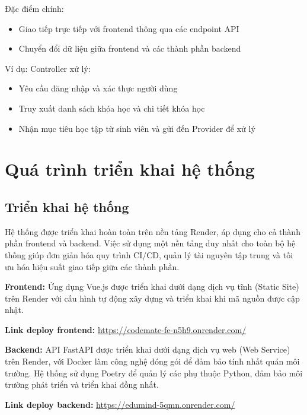 Đặc điểm chính:

\begin{itemize}
    \item Giao tiếp trực tiếp với frontend thông qua các endpoint API
    \item Chuyển đổi dữ liệu giữa frontend và các thành phần backend
\end{itemize}

Ví dụ: Controller xử lý:

\begin{itemize}
    \item Yêu cầu đăng nhập và xác thực người dùng
    \item Truy xuất danh sách khóa học và chi tiết khóa học
    \item Nhận mục tiêu học tập từ sinh viên và gửi đến Provider để xử lý
\end{itemize}

\section{Quá trình triển khai hệ thống}
\subsection*{Triển khai hệ thống}

Hệ thống được triển khai hoàn toàn trên nền tảng Render, áp dụng cho cả thành phần frontend và backend. Việc sử dụng một nền tảng duy nhất cho toàn bộ hệ thống giúp đơn giản hóa quy trình CI/CD, quản lý tài nguyên tập trung và tối ưu hóa hiệu suất giao tiếp giữa các thành phần.

\textbf{Frontend:} Ứng dụng Vue.js được triển khai dưới dạng dịch vụ tĩnh (Static Site) trên Render với cấu hình tự động xây dựng và triển khai khi mã nguồn được cập nhật.

\par \textbf{Link deploy frontend:} \textcolor{blue}{\href{https://codemate-fe-n5h9.onrender.com/}{https://codemate-fe-n5h9.onrender.com/}}

\textbf{Backend:} API FastAPI được triển khai dưới dạng dịch vụ web (Web Service) trên Render, với Docker làm công nghệ đóng gói để đảm bảo tính nhất quán môi trường. Hệ thống sử dụng Poetry để quản lý các phụ thuộc Python, đảm bảo môi trường phát triển và triển khai đồng nhất.

\par \textbf{Link deploy backend:} \textcolor{blue}{\href{https://edumind-5qmn.onrender.com/}{https://edumind-5qmn.onrender.com/}}

